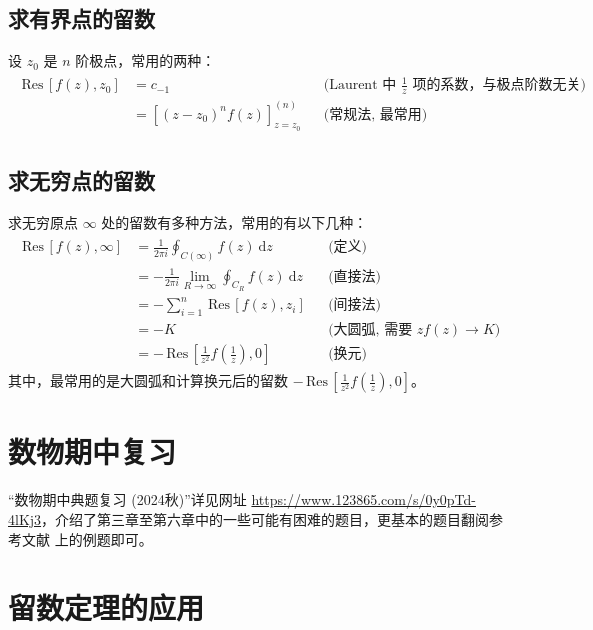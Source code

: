 \documentclass[UTF8]{report}
\def\Res{\mathrm{\,Res\,}}
\theoremstyle{MyLineTheoremStyle} %
\theoremstyle{MyBlockTheoremStyle} %
\theoremstyle{MySubsubsectionStyle} %
\begin{document}
\subsection{求有界点的留数}

设 $z_0$ 是 $n$ 阶极点，常用的两种：
\begin{align}
\begin{aligned}
    \Res \left[ f(z), z_0 \right] 
    & = c_{-1}  && \text{(Laurent 中 $\frac{1}{z}$ 项的系数，与极点阶数无关)}\\ 
    & = \left[(z - z_0)^n f(z)\right]^{(n)}_{z = z_0} && \text{(常规法, 最常用)}
\end{aligned}
\end{align}

\subsection{求无穷点的留数}

求无穷原点 $\infty$ 处的留数有多种方法，常用的有以下几种：
\begin{align}
\begin{aligned}
    \Res \left[ f(z), \infty \right] 
    &= \frac{1}{2\pi i}\oint_{C(\infty)} f(z) \ \mathrm{d} z && \text{(定义)} \\ 
    & = - \frac{1}{2 \pi i} \lim_{R \to \infty} \oint_{C_R} f(z) \ \mathrm{d}z&& \text{(直接法)} \\ 
    & = - \sum_{i=1}^{n} \Res \left[ f(z), z_i \right]  && \text{(间接法)} \\ 
    & = - K && \text{(大圆弧, 需要 $zf(z) \to K$)} \\ 
    & = - \Res \left[ \frac{1}{z^2} f(\frac{1}{z}), 0 \right] && \text{(换元)}
\end{aligned}
\end{align}
其中，最常用的是大圆弧和计算换元后的留数 $- \Res \left[ \frac{1}{z^2} f(\frac{1}{z}), 0 \right]$。

\section{数物期中复习}

“数物期中典题复习 (2024秋)”详见网址 \href{https://www.123865.com/s/0y0pTd-4lKj3}{https://www.123865.com/s/0y0pTd-4lKj3}，介绍了第三章至第六章中的一些可能有困难的题目，更基本的题目翻阅参考文献 \cite{数学物理方法习题指导} 上的例题即可。



\section{留数定理的应用}
\end{document}
